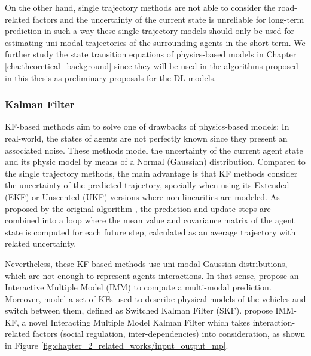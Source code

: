 
On the other hand, single trajectory methods are not able to consider the road-related factors and the uncertainty of the current state is unreliable for long-term prediction in such a way these single trajectory models should only be used for estimating uni-modal trajectories of the surrounding agents in the short-term. We further study the state transition equations of physics-based models in Chapter \ref{cha:theoretical_background} since they will be used in the algorithms proposed in this thesis as preliminary proposals for the \ac{DL} models.

\subsubsection{Kalman Filter}
\label{subsubsec:2_kalman_filter_mp}

\acf{KF}-based methods aim to solve one of drawbacks of physics-based models: In real-world, the states of agents are not perfectly known since they present an associated noise. These methods model the uncertainty of the current agent state and its physic model by means of a Normal (Gaussian) distribution. Compared to the single trajectory methods, the main advantage is that KF methods consider the uncertainty of the predicted trajectory, specially when using its Extended (EKF) or Unscented (UKF) versions where non-linearities are modeled. As proposed by the original algorithm \cite{kalman1960new}, the prediction and update steps are combined into a loop where the mean value and covariance matrix of the agent state is computed for each future step, calculated as an average trajectory with related uncertainty. 

Nevertheless, these \ac{KF}-based methods use uni-modal Gaussian distributions, which are not enough to represent agents interactions. In that sense, \cite{kaempchen2004imm} propose an Interactive Multiple Model (IMM) to compute a multi-modal prediction. Moreover, \cite{jin2015switched} model a set of \acp{KF} used to describe physical models of the vehicles and switch between them, defined as Switched Kalman Filter (SKF). \cite{lefkopoulos2020interaction} propose IMM-KF, a novel Interacting Multiple Model Kalman Filter which takes interaction-related factors (social regulation, inter-dependencies) into consideration, as shown in Figure \ref{fig:chapter_2_related_works/input_output_mp}.

